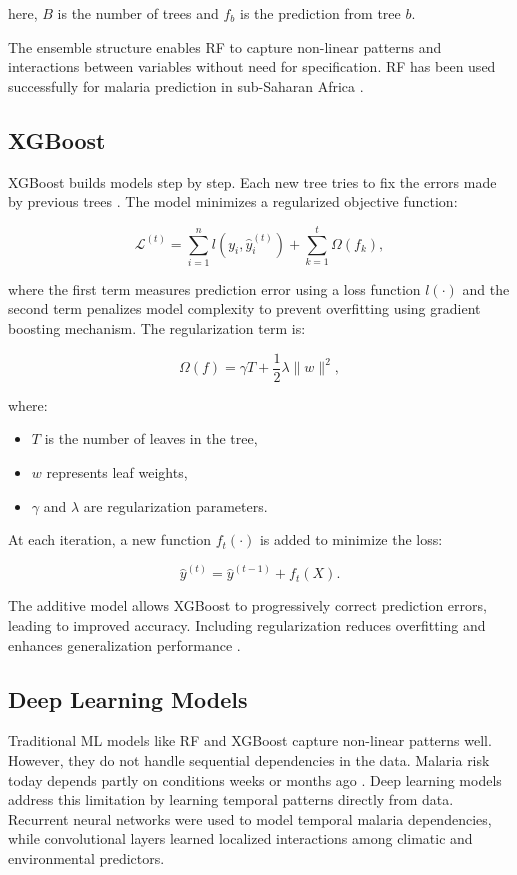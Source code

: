 here, \(B\) is the number of trees and \(f_b\) is the prediction from tree \(b\).


The ensemble  structure enables RF to capture non-linear patterns and interactions between variables without need for specification. RF has been used successfully for malaria prediction in sub-Saharan Africa \cite{Egbuna2025}.

\subsection{XGBoost}
\label{sec:XGBoost}
XGBoost builds models step by step. Each new tree tries to fix the errors made by previous trees \cite{Okundalaye2025Climate-based}. The model minimizes a regularized objective function:

\[
\mathcal{L}^{(t)} = \sum_{i=1}^{n} l(y_i, \hat{y}_i^{(t)}) + \sum_{k=1}^{t} \Omega(f_k),
\]

where the first term measures prediction error using a loss function \(l(\cdot)\) and the second term penalizes model complexity to prevent overfitting \cite{Egbuna2025} using gradient boosting mechanism. The regularization term is:

\[
\Omega(f) = \gamma T + \frac{1}{2} \lambda \|w\|^2,
\]

where:
\begin{itemize}
	\item $T$ is the number of leaves in the tree,
	\item $w$ represents leaf weights,
	\item $\gamma$ and $\lambda$ are regularization parameters.
\end{itemize}
At each iteration, a new function $f_t(\cdot)$ is added to minimize the loss:


\[
\hat{y}^{(t)} = \hat{y}^{(t-1)} + f_t(X).
\]

The additive model allows XGBoost to progressively correct prediction errors, leading to improved accuracy. Including regularization reduces overfitting and enhances generalization performance \cite{Ly2025Forecasting}.



\subsection{Deep Learning Models}

Traditional ML models like RF and XGBoost capture non-linear patterns well. However, they do not handle sequential dependencies in the data. Malaria risk today depends partly on conditions weeks or months ago \cite{Okundalaye2025Climate-based}. Deep learning models address this limitation by learning temporal patterns directly from data. Recurrent neural networks were used to model temporal malaria dependencies, while convolutional layers learned localized interactions among climatic and environmental predictors.

